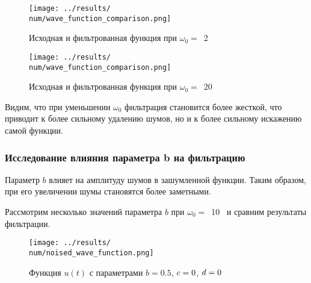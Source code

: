 \def\num{3}
\def\imageclip{2}


\begin{figure}[ht!]
    \centering
    \texttt{[image: ../results/\\num/wave\_function\_comparison.png]}
    \caption{Исходная и фильтрованная функция при $\omega_0=$~\imageclip}
    \label{fig:wave_function_comparison_\num}
\end{figure}

\def\num{4}
\def\imageclip{20}


\begin{figure}[ht!]
    \centering
    \texttt{[image: ../results/\\num/wave\_function\_comparison.png]}
    \caption{Исходная и фильтрованная функция при $\omega_0=$~\imageclip}
    \label{fig:wave_function_comparison_\num}
\end{figure}

\FloatBarrier
Видим, что при уменьшении $\omega_0$ фильтрация становится более жесткой, что приводит к более сильному удалению шумов, но и к более сильному искажению самой функции.

\FloatBarrier
\subsubsection{Исследование влияния параметра b на фильтрацию}
Параметр $b$ влияет на амплитуду шумов в зашумленной функции. Таким образом, при его увеличении шумы становятся более заметными. 

\def\imageclip{10}
Рассмотрим несколько значений параметра $b$ при $\omega_0 =$~\imageclip~ и сравним результаты фильтрации.

\def\num{5}
\def\b{0.5}

\begin{figure}[ht!]
    \centering
    \texttt{[image: ../results/\\num/noised\_wave\_function.png]}
    \caption{Функция $u(t)$ с параметрами $b = \b$, $c = 0$, $d = 0$}
    \label{fig:noised_wave_function_\num}
\end{figure}

